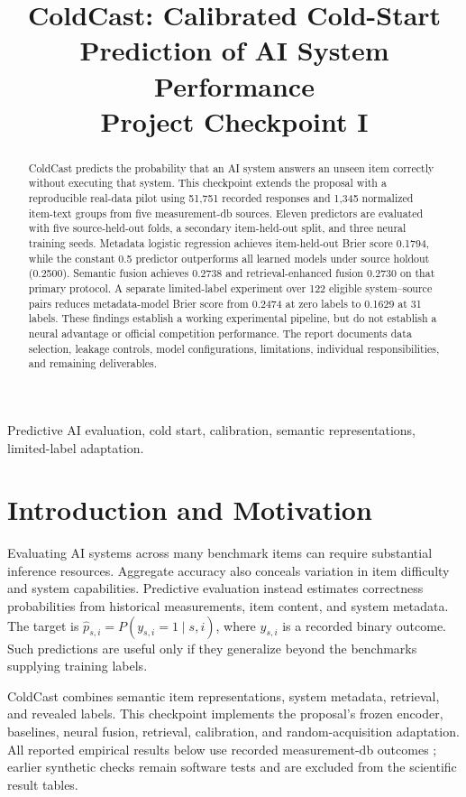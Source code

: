 \documentclass[conference]{IEEEtran}
\title{ColdCast: Calibrated Cold-Start Prediction of AI System Performance\\
\large Project Checkpoint I}
\author{
\IEEEauthorblockN{Yi Chen Kuo, Sudip Manchare, Jaideep Manupati, Akshada Shailesh Rane}
\IEEEauthorblockA{Department of Computer Science, Virginia Tech, Alexandria, Virginia, USA\\
\{alvin9840, akshada, jaideepm21, msudip\}@vt.edu}
}
\begin{document}
\maketitle

\begin{abstract}
ColdCast predicts the probability that an AI system answers an unseen item correctly without executing that system. This checkpoint extends the proposal with a reproducible real-data pilot using 51,751 recorded responses and 1,345 normalized item-text groups from five measurement-db sources. Eleven predictors are evaluated with five source-held-out folds, a secondary item-held-out split, and three neural training seeds. Metadata logistic regression achieves item-held-out Brier score 0.1794, while the constant 0.5 predictor outperforms all learned models under source holdout (0.2500). Semantic fusion achieves 0.2738 and retrieval-enhanced fusion 0.2730 on that primary protocol. A separate limited-label experiment over 122 eligible system--source pairs reduces metadata-model Brier score from 0.2474 at zero labels to 0.1629 at 31 labels. These findings establish a working experimental pipeline, but do not establish a neural advantage or official competition performance. The report documents data selection, leakage controls, model configurations, limitations, individual responsibilities, and remaining deliverables.
\end{abstract}
\begin{IEEEkeywords}
Predictive AI evaluation, cold start, calibration, semantic representations, limited-label adaptation.
\end{IEEEkeywords}

\section{Introduction and Motivation}
Evaluating AI systems across many benchmark items can require substantial inference resources. Aggregate accuracy also conceals variation in item difficulty and system capabilities. Predictive evaluation instead estimates correctness probabilities from historical measurements, item content, and system metadata. The target is $\hat p_{s,i}=P(y_{s,i}=1\mid s,i)$, where $y_{s,i}$ is a recorded binary outcome. Such predictions are useful only if they generalize beyond the benchmarks supplying training labels.

ColdCast combines semantic item representations, system metadata, retrieval, and revealed labels. This checkpoint implements the proposal's frozen encoder, baselines, neural fusion, retrieval, calibration, and random-acquisition adaptation. All reported empirical results below use recorded measurement-db outcomes \cite{measurement}; earlier synthetic checks remain software tests and are excluded from the scientific result tables.
\end{document}
